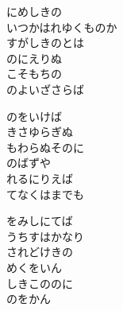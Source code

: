 \documentclass[10pt,b5j]{tarticle} %
\begin{document}
\vspace{1.5em} %
\newcommand{\linespace}{0.5em} %
\newcommand{\blocksize}{0.5\hsize} %
\begin{enumerate} %
    \begin{minipage}[c]{\blocksize}
    
        \vspace{\linespace}
        \item
        にめしきの\\
        いつかはれゆくものか\\
        すがしきのとは\\
        のにえりぬ\\
        こそもちの\\
        のよいざさらば
        
        \vspace{\linespace}
        \item
        のをいけば\\
        きさゆらぎぬ\\
        もわらぬそのに\\
        のばずや\\
        れるにりえば\\
        てなくはまでも
        
        \vspace{\linespace}
        \item
        をみしにてば\\
        うちすはかなり\\
        されどけきの\\
        めくをいん\\
        しきこののに\\
        のをかん
    
    \end{minipage}
\end{enumerate} %
\end{document}
